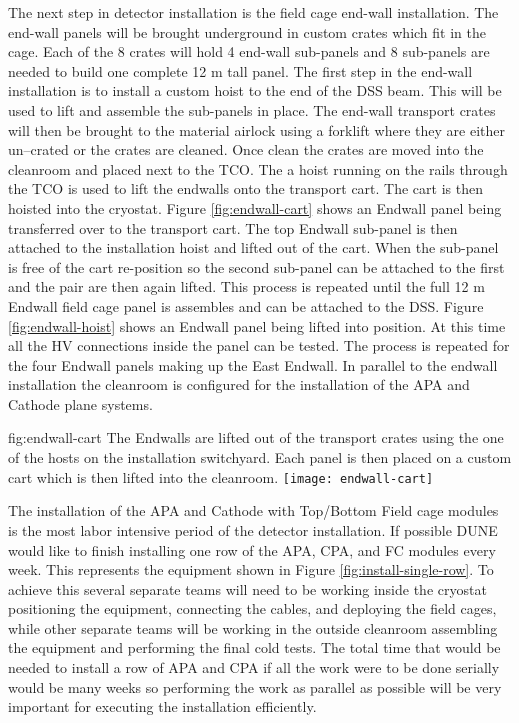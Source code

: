 The next step in detector installation is the field cage end-wall installation. 
The end-wall panels will be brought underground in custom crates which fit in the cage. 
Each of the 8 crates will hold 4 end-wall sub-panels and 8 sub-panels are needed to build one complete 12 \si{m} tall panel.  
The first step in the end-wall installation is to install a custom hoist to the end of the DSS beam. 
This will be used to lift and assemble the sub-panels in place. 
The end-wall transport crates will then be brought to the material airlock using a forklift where they are either un--crated or the crates are cleaned. 
Once clean the crates are moved into the cleanroom and placed next to the TCO. The a hoist running on the rails through the TCO is used to lift the endwalls onto the transport cart. The cart is then hoisted into the cryostat. 
Figure \ref{fig:endwall-cart} shows an Endwall panel being transferred over to the transport cart.
The top Endwall sub-panel is then attached to the installation hoist and lifted out of the cart. When the sub-panel is free of  the cart re-position so the second sub-panel can be attached to the first and the pair are then again lifted. This process is repeated until the full 12 \si{m} Endwall field cage panel is assembles and can be attached to the DSS. 
Figure \ref{fig:endwall-hoist} shows an Endwall panel being lifted into position.
At this time all the HV connections inside the panel can be tested. The process is repeated for the four Endwall panels making up the East Endwall. 
In parallel to the endwall installation the cleanroom is configured for the installation of the APA and Cathode plane systems.

\begin{dunefigure}{fig:endwall-cart}
  {The Endwalls are lifted out of the transport crates using the one of the hosts on the installation switchyard. Each panel is then placed on a custom cart which is then lifted into the cleanroom.}
\texttt{[image: endwall-cart]}
\end{dunefigure}


The installation of the APA and Cathode with Top/Bottom Field cage modules is the most labor intensive period of the detector installation. If possible DUNE would like to finish installing one row of the APA, CPA, and FC modules every week. This represents the equipment shown in Figure \ref{fig:install-single-row}. To achieve this several separate teams will need to be working inside the cryostat positioning the equipment, connecting the cables, and deploying the field cages, while  other separate teams will be working in the outside cleanroom assembling the equipment and performing the final cold tests. The total time that would be needed to install a row of APA and CPA if all the work were to be done serially would be many weeks so performing the work as parallel  as possible will be very important for executing the installation efficiently. 


